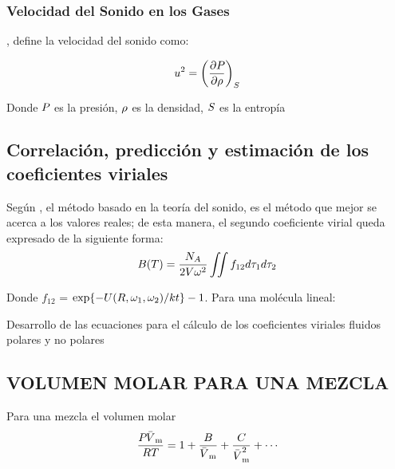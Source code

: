 \subsubsection*{Velocidad del Sonido en los Gases}

\parencite[p. 186]{Wilhelm2010}, define la velocidad del sonido como:

\begin{align}
  \label{cap:subsec:velocidadSonido}
  \SoundSpeed{}
\end{align}

Donde $\P{}$  es la presión, $\Density$ es la densidad, $\Entropy$ es la entropía

\subsection{Correlación, predicción y estimación de los coeficientes viriales}
\label{cap2:subsec:tagEqnPredict}




Según \parencite[ p. 12]{Dymond2002}, el método basado en la teoría del sonido, es el método que mejor se acerca a los valores reales; de esta manera, el segundo coeficiente virial queda expresado de la siguiente forma:
\begin{equation}
  \eqSndVirialCoeff{1}{2}{\T{}}
\end{equation}


Donde $f_{12}$ = $ \ce{exp}{\{-U(R, \omega_1 , \omega_2)/kt\}} - 1 $. Para una molécula lineal:

Desarrollo de las ecuaciones para el cálculo de los coeficientes viriales fluidos polares y no polares





\subsection{VOLUMEN MOLAR PARA UNA MEZCLA}
    Para una mezcla el volumen molar
  \begin{equation}
    \eqVirialForVDevelopForMixture
  \end{equation}
    
    \eqVirialForVDevelopMixtureNaming